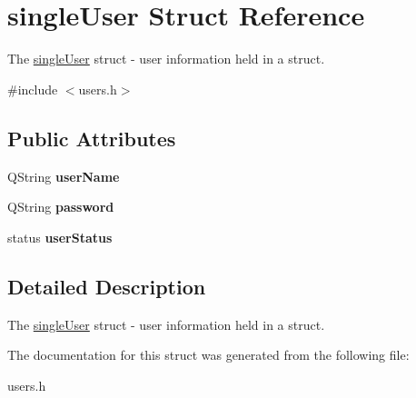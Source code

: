 \hypertarget{structsingle_user}{}\section{single\+User Struct Reference}
\label{structsingle_user}


The \hyperlink{structsingle_user}{single\+User} struct -\/ user information held in a struct.  




{\ttfamily \#include $<$users.\+h$>$}

\subsection*{Public Attributes}
\begin{DoxyCompactItemize}
\item 
\mbox{\label{structsingle_user_a0cab0883de8f6f08c785f96faa0268e6}} 
Q\+String {\bfseries user\+Name}
\item 
\mbox{\label{structsingle_user_a155ccd8267749274236b1748066383dc}} 
Q\+String {\bfseries password}
\item 
\mbox{\label{structsingle_user_a2b3b79b107ddc525b1dcd260c1901673}} 
status {\bfseries user\+Status}
\end{DoxyCompactItemize}


\subsection{Detailed Description}
The \hyperlink{structsingle_user}{single\+User} struct -\/ user information held in a struct. 

The documentation for this struct was generated from the following file\+:\begin{DoxyCompactItemize}
\item 
users.\+h\end{DoxyCompactItemize}
